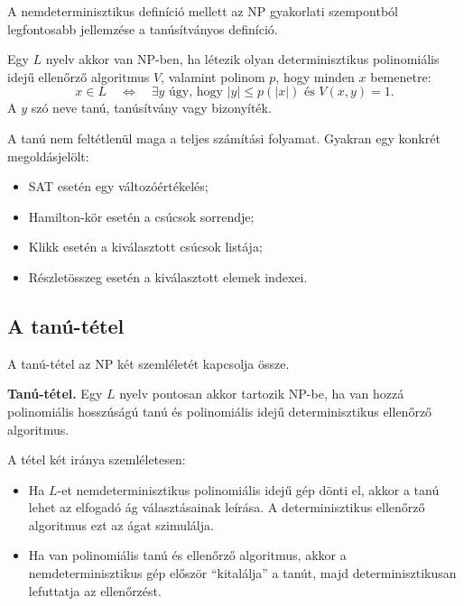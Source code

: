 A nemdeterminisztikus definíció mellett az $\mathrm{NP}$ gyakorlati szempontból legfontosabb jellemzése a tanúsítványos definíció.

\begin{summarybox}
Egy $L$ nyelv akkor van $\mathrm{NP}$-ben, ha létezik olyan determinisztikus polinomiális idejű ellenőrző algoritmus $V$, valamint polinom $p$, hogy minden $x$ bemenetre:
\[
  x\in L
  \quad\Longleftrightarrow\quad
  \exists y\text{ úgy, hogy } |y|\leq p(|x|) \text{ és } V(x,y)=1.
\]
A $y$ szó neve tanú, tanúsítvány vagy bizonyíték.
\end{summarybox}

A tanú nem feltétlenül maga a teljes számítási folyamat. Gyakran egy konkrét megoldásjelölt:

\begin{itemize}
  \item SAT esetén egy változóértékelés;
  \item Hamilton-kör esetén a csúcsok sorrendje;
  \item Klikk esetén a kiválasztott csúcsok listája;
  \item Részletösszeg esetén a kiválasztott elemek indexei.
\end{itemize}


\subsection{A tanú-tétel}

A tanú-tétel az $\mathrm{NP}$ két szemléletét kapcsolja össze.

\begin{summarybox}
\textbf{Tanú-tétel.} Egy $L$ nyelv pontosan akkor tartozik $\mathrm{NP}$-be, ha van hozzá polinomiális hosszúságú tanú és polinomiális idejű determinisztikus ellenőrző algoritmus.
\end{summarybox}

A tétel két iránya szemléletesen:

\begin{itemize}
  \item Ha $L$-et nemdeterminisztikus polinomiális idejű gép dönti el, akkor a tanú lehet az elfogadó ág választásainak leírása. A determinisztikus ellenőrző algoritmus ezt az ágat szimulálja.
  \item Ha van polinomiális tanú és ellenőrző algoritmus, akkor a nemdeterminisztikus gép először ``kitalálja'' a tanút, majd determinisztikusan lefuttatja az ellenőrzést.
\end{itemize}

